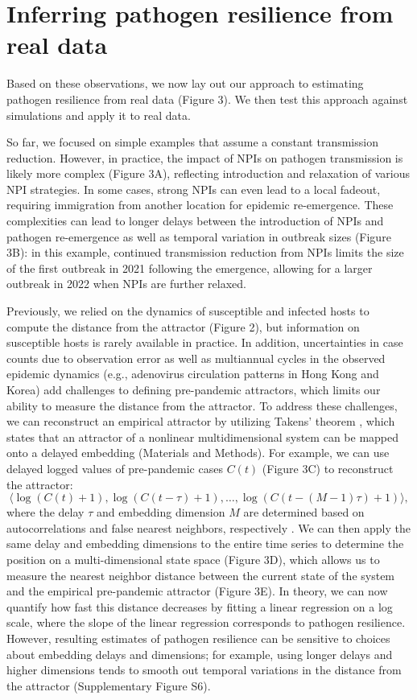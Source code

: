 \documentclass[12pt]{article}
\begin{document}
\section*{Inferring pathogen resilience from real data}

Based on these observations, we now lay out our approach to estimating pathogen resilience from real data (Figure 3).
We then test this approach against simulations and apply it to real data.

So far, we focused on simple examples that assume a constant transmission reduction.
However, in practice, the impact of NPIs on pathogen transmission is likely more complex (Figure 3A), reflecting introduction and relaxation of various NPI strategies.
In some cases, strong NPIs can even lead to a local fadeout, requiring immigration from another location for epidemic re-emergence.
These complexities can lead to longer delays between the introduction of NPIs and pathogen re-emergence as well as temporal variation in outbreak sizes (Figure 3B):
in this example, continued transmission reduction from NPIs limits the size of the first outbreak in 2021 following the emergence, allowing for a larger outbreak in 2022 when NPIs are further relaxed.

Previously, we relied on the dynamics of susceptible and infected hosts to compute the distance from the attractor (Figure 2), but information on susceptible hosts is rarely available in practice.
In addition, uncertainties in case counts due to observation error as well as multiannual cycles in the observed epidemic dynamics (e.g., adenovirus circulation patterns in Hong Kong and Korea) add challenges to defining pre-pandemic attractors, which limits our ability to measure the distance from the attractor.
To address these challenges, we can reconstruct an empirical attractor by utilizing Takens' theorem \citep{takens2006detecting}, which states that an attractor of a nonlinear multidimensional system can be mapped onto a delayed embedding (Materials and Methods).
For example, we can use delayed logged values of pre-pandemic cases $C(t)$ (Figure 3C) to reconstruct the attractor:
\begin{equation}
\langle\log(C(t)+1), \log(C(t-\tau)+1), \dots, \log(C(t-(M-1)\tau)+1)\rangle,
\end{equation}
where the delay $\tau$ and embedding dimension $M$ are determined based on autocorrelations and false nearest neighbors, respectively \citep{kennel1992determining,tan2023selecting}.
We can then apply the same delay and embedding dimensions to the entire time series to determine the position on a multi-dimensional state space (Figure 3D), which allows us to measure the nearest neighbor distance between the current state of the system and the empirical pre-pandemic attractor (Figure 3E).
In theory, we can now quantify how fast this distance decreases by fitting a linear regression on a log scale, where the slope of the linear regression corresponds to pathogen resilience.
However, resulting estimates of pathogen resilience can be sensitive to choices about embedding delays and dimensions; 
for example, using longer delays and higher dimensions tends to smooth out temporal variations in the distance from the attractor (Supplementary Figure S6).
\end{document}
